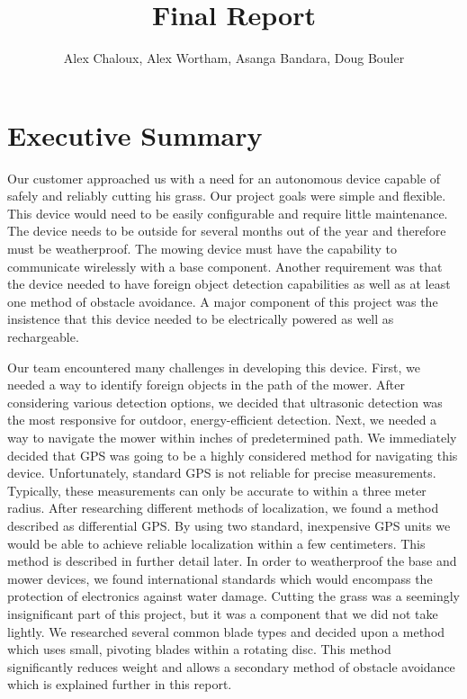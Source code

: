 \documentclass[11pt,letterpaper]{article}
\title{Final Report}
\author{Alex Chaloux, Alex Wortham, Asanga Bandara, Doug Bouler}
\begin{document}
\reqstitlepage

\tableofcontents
\clearpage
{}

\section{Executive Summary}


Our customer approached us with a need for an autonomous device capable of safely and reliably cutting his grass. Our project goals were simple and flexible. This device would need to be easily configurable and require little maintenance. The device needs to be outside for several months out of the year and therefore must be weatherproof. The mowing device must have the capability to communicate wirelessly with a base component.  Another requirement was that the device needed to have foreign object detection capabilities as well as at least one method of obstacle avoidance. A major component of this project was the insistence that this device needed to be electrically powered as well as rechargeable.

Our team encountered many challenges in developing this device. First, we needed a way to identify foreign objects in the path of the mower. After considering various detection options, we decided that ultrasonic detection was the most responsive for outdoor, energy-efficient detection. Next, we needed a way to navigate the mower within inches of predetermined path. We immediately decided that GPS was going to be a highly considered method for navigating this device. Unfortunately, standard GPS is not reliable for precise measurements. Typically, these measurements can only be accurate to within a three meter radius. After researching different methods of localization, we found a method described as differential GPS. By using two standard, inexpensive GPS units we would be able to achieve reliable localization within a few centimeters. This method is described in further detail later. In order to weatherproof the base and mower devices, we found international standards which would encompass the protection of electronics against water damage. Cutting the grass was a seemingly insignificant part of this project, but it was a component that we did not take lightly. We researched several common blade types and decided upon a method which uses small, pivoting blades within a rotating disc. This method significantly reduces weight and allows a secondary method of obstacle avoidance which is explained further in this report.
\end{document}
